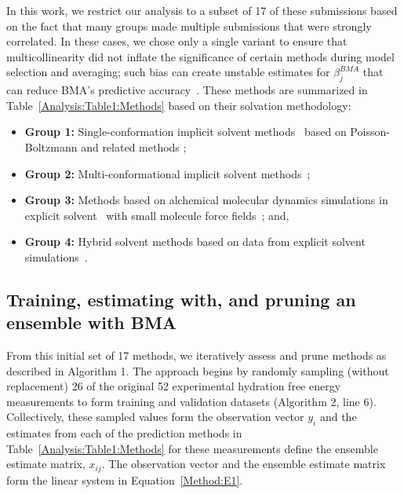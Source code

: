 \documentclass[12pt]{article}
\newcommand{\+}[1]{\ensuremath{\mathbf{#1}}}
\begin{document}
In this work, we restrict our analysis to a subset of 17 of these submissions based on the fact that many groups made multiple submissions that were strongly correlated. In these cases, we chose only a single variant to ensure that multicollinearity did not inflate the significance of certain methods during model selection and averaging; such bias can create unstable estimates for $\beta^{BMA}_j$ that can reduce BMA's predictive accuracy~\cite{Clyde:1999}.  These methods are summarized in Table~\ref{Analysis:Table1:Methods} based on their solvation methodology: 

\begin {itemize}
\item \textbf{Group 1:} Single-conformation implicit solvent methods~\cite{Ellingson:2014,Nicholl:2010,Hawkins} based on Poisson-Boltzmann and related methods \cite{Fixman:1979, Honig:1995, Davis:1990}; 
\item \textbf{Group 2:} Multi-conformational implicit solvent methods~\cite{Sandberg:2013,Klamt:2009,Hogues:2014,Sulea:2011,Reinisch:2014};
\item \textbf{Group 3:} Methods based on alchemical molecular dynamics simulations in explicit solvent~\cite{Klimovich:2010,Muddana:2014,Mobley:2009c,Mobley:2007} with small molecule force fields~\cite{Wang:2004B};  and, 
\item \textbf{Group 4:} Hybrid solvent methods based on data from explicit solvent simulations~\cite{Li:2014}.
\end {itemize}


 
\subsection{Training, estimating with, and pruning an ensemble with BMA}
\label{EP:training}
From this initial set of 17 methods, we iteratively assess and prune methods as described in Algorithm 1. The approach begins by randomly sampling (without replacement) 26 of the original 52 experimental hydration free energy measurements to form training and validation datasets (Algorithm 2, line 6).  Collectively, these sampled values form the observation vector $y_i$ and the estimates from each of the prediction methods in Table~\ref{Analysis:Table1:Methods} for these measurements define the ensemble estimate matrix, $x_{i j}$. The observation vector and the ensemble estimate matrix form the linear system in Equation~\ref{Method:E1}.  
\end{document}
